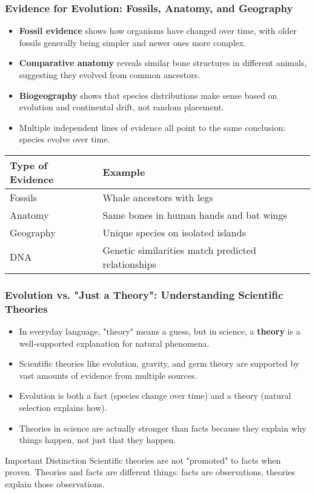 \documentclass{beamer}
\begin{document}
	\begin{frame}
		\frametitle{Evidence for Evolution: Fossils, Anatomy, and Geography}
		\begin{itemize}
			\item \textbf{Fossil evidence} shows how organisms have changed over time, with older fossils generally being simpler and newer ones more complex.
			\item \textbf{Comparative anatomy} reveals similar bone structures in different animals, suggesting they evolved from common ancestors.
			\item \textbf{Biogeography} shows that species distributions make sense based on evolution and continental drift, not random placement.
			\item Multiple independent lines of evidence all point to the same conclusion: species evolve over time.
		\end{itemize}
		\begin{table}
			\centering
			\begin{tabular}{|l|l|}
				\hline
				\textbf{Type of Evidence} & \textbf{Example} \\
				\hline
				Fossils & Whale ancestors with legs \\
				Anatomy & Same bones in human hands and bat wings \\
				Geography & Unique species on isolated islands \\
				DNA & Genetic similarities match predicted relationships \\
				\hline
			\end{tabular}
		\end{table}
	\end{frame}
	
	\begin{frame}
		\frametitle{Evolution vs. "Just a Theory": Understanding Scientific Theories}
		\begin{itemize}
			\item In everyday language, "theory" means a guess, but in science, a \textbf{theory} is a well-supported explanation for natural phenomena.
			\item Scientific theories like evolution, gravity, and germ theory are supported by vast amounts of evidence from multiple sources.
			\item Evolution is both a fact (species change over time) and a theory (natural selection explains how).
			\item Theories in science are actually stronger than facts because they explain why things happen, not just that they happen.
		\end{itemize}
		\begin{alertblock}{Important Distinction}
			Scientific theories are not "promoted" to facts when proven. Theories and facts are different things: facts are observations, theories explain those observations.
		\end{alertblock}
	\end{frame}
	
\end{document}
